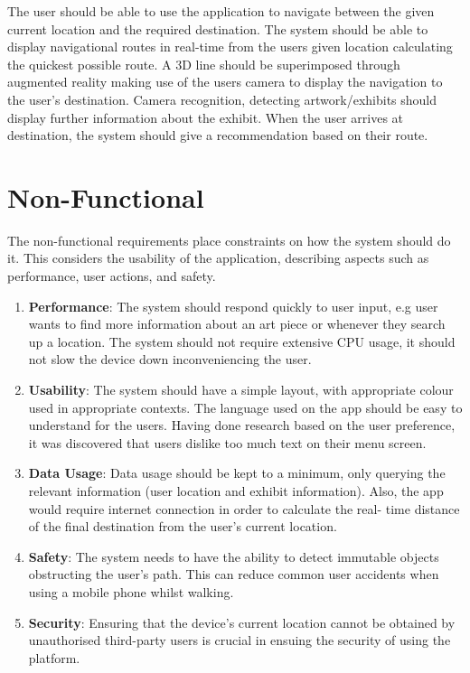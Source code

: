 The user should be able to use the application to navigate between the given current location and the required destination. The system should be able to display navigational routes in real-time from the users given location calculating the quickest possible route. A 3D line should be superimposed through augmented reality making use of the users camera to display the navigation to the user’s destination.
Camera recognition, detecting artwork/exhibits should display further information about the exhibit. When the user arrives at destination, the system should give a recommendation based on their route.

\section{Non-Functional}
The non-functional requirements place constraints on how the system should do it. This considers the usability of the application, describing aspects such as performance, user actions, and safety.
\begin{enumerate}
	\item \textbf{Performance}: The system should respond quickly to user input, e.g user wants to find more information about an art piece or whenever they search up a location. The system should not require extensive CPU usage, it should not slow the device down inconveniencing the user.
	\item \textbf{Usability}: The system should have a simple layout, with appropriate colour used in appropriate contexts. The language used on the app should be easy to understand for the users. Having done research based on the user preference, it was discovered that users dislike too much text on their menu screen.
	\item \textbf{Data Usage}: Data usage should be kept to a minimum, only querying the relevant information (user location and exhibit information). Also, the app would require internet connection in order to calculate the real- time distance of the final destination from the user’s current location.
	\item \textbf{Safety}: The system needs to have the ability to detect immutable objects obstructing the user’s path. This can reduce common user accidents when using a mobile phone whilst walking.
	\item \textbf{Security}: Ensuring that the device’s current location cannot be obtained by unauthorised third-party users is crucial in ensuing the security of using the platform.
\end{enumerate}
